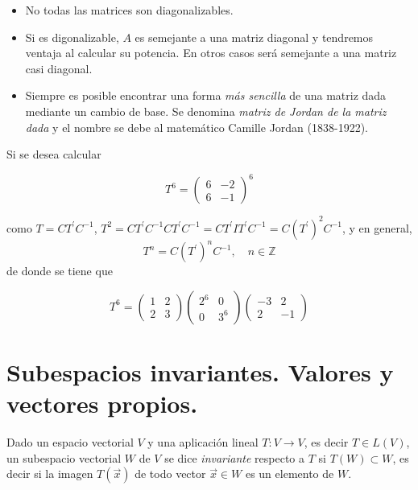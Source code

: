 \begin{remark}
 \begin{itemize}
     \item 
No todas las matrices son diagonalizables.

\item 
Si es digonalizable,  $A$ es semejante a una matriz diagonal y tendremos ventaja al calcular su potencia. En otros casos  será semejante a una matriz casi diagonal.
  \item 
  Siempre es posible encontrar una forma \textit{ más sencilla} de una matriz dada  mediante un cambio de base. Se denomina \textit{matriz de Jordan de la matriz dada} y el nombre se debe al matemático Camille Jordan (1838-1922).
 \end{itemize}   
\end{remark}


\bigskip
Si se desea  calcular 

\bigskip

$$T^6=\left(\begin{array}{cc}  6 & -2  \\ 6 &  -1
\end{array}
 \right)^6$$

\bigskip
\noindent
como  $T=CT^\prime C^{-1}$,  $T^2=CT^\prime C^{-1} CT^\prime C^{-1}=CT^\prime I T^\prime C^{-1}=C(T^\prime)^2 C^{-1}$, y en general, 
$$T^n=C(T^\prime)^n C^{-1}, \quad n \in \mathbb{Z}$$
\noindent
de donde se tiene que 

\bigskip

$$T^6=\left(\begin{array}{cc}  1 & 2  \\ 2 &  3
\end{array}
 \right) \left(\begin{array}{cc}  2^6 & 0  \\ 0 &  3^6
\end{array}
 \right) \left(\begin{array}{cc}  -3 & 2  \\ 2 &  -1
\end{array}
 \right) $$

\bigskip

\section{Subespacios invariantes. Valores y vectores propios.}
\label{Subespacios invariantes}


Dado un espacio vectorial $V$ y una aplicación lineal  $T: V \rightarrow V$, es decir $T \in L(V)$, un subespacio vectorial $W$ de $V$ se dice  \textit{invariante}   respecto a $T$ si $T(W)\subset W$, es decir si la imagen $T(\vec{x})$ de todo vector  $\vec{x}\in W$ es un elemento de $W$.

